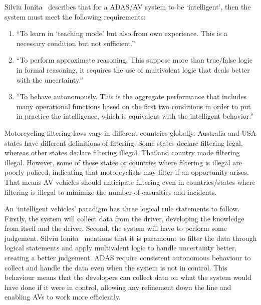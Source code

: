 \documentclass[12pt]{report} %
\begin{document}
		Silviu Ionita~\cite{ionita_autonomous_2017} describes that for a ADAS/AV system to be `intelligent', then the system must meet the following requirements:
		\begin{enumerate}
			\item ``To learn in `teaching mode' but also from own experience. This is a necessary condition but not sufficient.''~\cite{ionita_autonomous_2017}
			\item ``To perform approximate reasoning. This suppose more than true/false logic in formal
			reasoning, it requires the use of multivalent logic that deals better with the uncertainty.''~\cite{ionita_autonomous_2017}
			\item ``To behave autonomously. This is the aggregate performance that includes many operational functions based on the first two conditions in order to put in practice the intelligence, which is equivalent with the intelligent behavior.''~\cite{ionita_autonomous_2017}
		\end{enumerate}

		Motorcycling filtering laws vary in different countries globally. Australia and USA states have different definitions of filtering. Some states declare filtering legal, whereas other states declare filtering illegal. Thailand country made filtering illegal. However, some of these states or countries where filtering is illegal are poorly policed, indicating that motorcyclists may filter if an opportunity arises. That means AV vehicles should anticipate filtering even in countries/states where filtering is illegal to minimize the number of casualties and incidents.~\cite{promraksa_lane-filtering_2022}

		An `intelligent vehicles' paradigm has three logical rule statements to follow. Firstly, the system will collect data from the driver, developing the knowledge from itself and the driver. Second, the system will have to perform some judgement. Silviu Ionita~\cite{ionita_autonomous_2017} mentions that it is paramount to filter the data through logical statements and apply multivalent logic to handle uncertainty better, creating a better judgement. ADAS require consistent autonomous behaviour to collect and handle the data even when the system is not in control. This behaviour means that the developers can collect data on what the system would have done if it were in control, allowing any refinement down the line and enabling AVs to work more efficiently.
\end{document}
